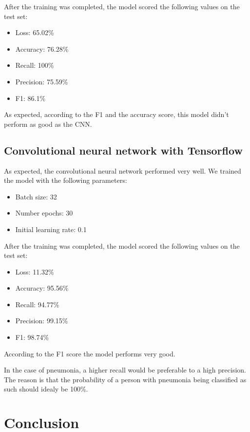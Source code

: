 \documentclass{article}
\begin{document}
After the training was completed, the model scored the following values on the test set:

\begin{itemize}
  \item Loss: 65.02\%
  \item Accuracy: 76.28\%
  \item Recall: 100\%
  \item Precision: 75.59\%
  \item F1: 86.1\%
\end{itemize}

As expected, according to the F1 and the accuracy score, this model didn't perform as good as the CNN. 

\subsection{Convolutional neural network with Tensorflow}
\label{sec:cnn_with_tensorflow}

As expected, the convolutional neural network performed very well.
We trained the model with the following parameters:
\begin{itemize}
  \item Batch size: 32
  \item Number epochs: 30
  \item Initial learning rate: 0.1
\end{itemize}

After the training was completed, the model scored the following values on the test set:

\begin{itemize}
  \item Loss: 11.32\%
  \item Accuracy: 95.56\%
  \item Recall: 94.77\%
  \item Precision: 99.15\%
  \item F1: 98.74\%
\end{itemize}

According to the F1 score the model performs very good. 

In the case of pneumonia, a higher recall would be preferable to a high precision. 
The reason is that the probability of a person with pneumonia being classified as such should idealy be 100\%.

\section{Conclusion}
\end{document}
